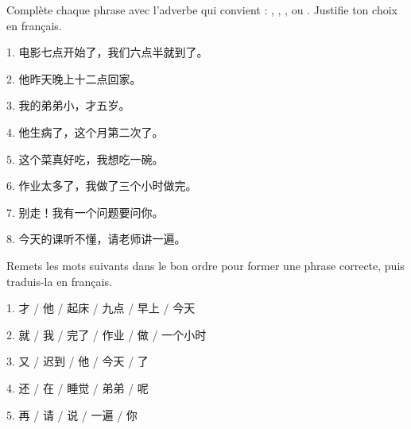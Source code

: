 \documentclass[11pt]{article}
\newcommand{\zh}[1]{\ifmmode\text{#1}\else{#1}\fi}
\begin{document}
\begin{exercice}
Complète chaque phrase avec l'adverbe qui convient : \zh{就}, \zh{才}, \zh{还}, \zh{又} ou \zh{再}. Justifie ton choix en français.

1. 电影七点\underline{\hspace{1.2cm}}开始了，我们六点半就到了。

2. 他昨天晚上十二点\underline{\hspace{1.2cm}}回家。

3. 我的弟弟\underline{\hspace{1.2cm}}小，才五岁。

4. 他\underline{\hspace{1.2cm}}生病了，这个月第二次了。

5. 这个菜真好吃，我想\underline{\hspace{1.2cm}}吃一碗。

6. 作业太多了，我做了三个小时\underline{\hspace{1.2cm}}做完。

7. 别走！我\underline{\hspace{1.2cm}}有一个问题要问你。

8. 今天的课听不懂，请老师\underline{\hspace{1.2cm}}讲一遍。
\end{exercice}

\begin{exercice}
Remets les mots suivants dans le bon ordre pour former une phrase correcte, puis traduis-la en français.

1. 才 / 他 / 起床 / 九点 / 早上 / 今天

2. 就 / 我 / 完了 / 作业 / 做 / 一个小时

3. 又 / 迟到 / 他 / 今天 / 了

4. 还 / 在 / 睡觉 / 弟弟 / 呢

5. 再 / 请 / 说 / 一遍 / 你
\end{exercice}
\end{document}
